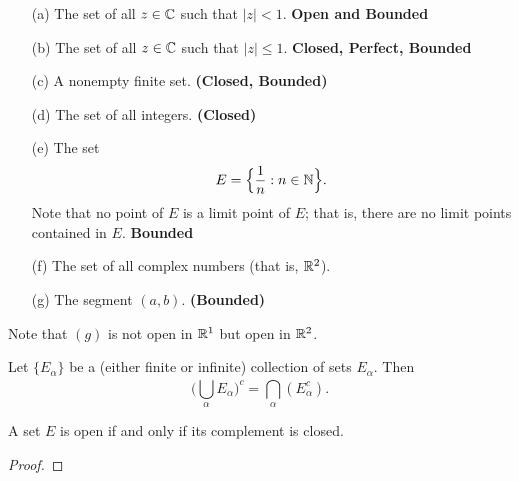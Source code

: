 \documentclass[11pt,a4paper]{book}
\begin{document}
\begin{eg}
   \begin{enumerate}
       \item[(a)] The set of all \( z \in \mathbb{C}  \) such that \( | z  |  < 1  \). \textbf{Open and Bounded}
        \item[(b)] The set of all \( z \in \mathbb{C}  \) such that \( | z  |  \leq 1  \). \textbf{Closed, Perfect, Bounded}  
        \item[(c)] A nonempty finite set. \textbf{(Closed, Bounded)}
        \item[(d)] The set of all integers. \textbf{(Closed)}
        \item[(e)] The set 
            \[ E =  \Big\{ \frac{ 1 }{ n } : n \in \mathbb{N}  \Big\}.  \]
            Note that no point of \( E  \) is a limit point of \( E  \); that is, there are no limit points contained in \( E  \). \textbf{Bounded}
        \item[(f)] The set of all complex numbers (that is, \( \mathbb{R}^{2} \)).
        \item[(g)] The segment \( (a,b) \). \textbf{(Bounded)}
   \end{enumerate}  
\end{eg}

Note that \( (g) \) is not open in \( \mathbb{R}^{1} \) but open in \( \mathbb{R}^{2} \).

\begin{theorem}[ ]
    Let \( \{ {E}_{\alpha} \}  \) be a (either finite or infinite) collection of sets \( {E}_{\alpha} \). Then
    \[  \Big(  \bigcup_{ \alpha } {E}_{\alpha}  \Big)^{c} = \bigcap_{ \alpha }^{  } ({E}_{\alpha}^{c}). \]
\end{theorem}

\begin{theorem}[ ]
    A set \( E  \) is open if and only if its complement is closed.
\end{theorem}
\begin{proof}

\end{proof}
\end{document}
